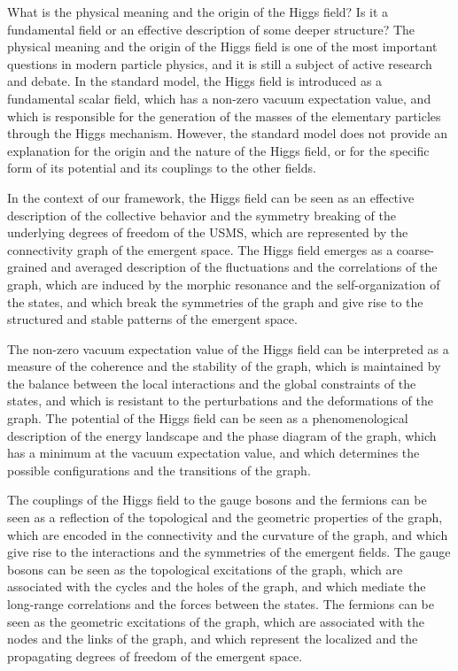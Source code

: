 \begin{tcolorbox}[colback=green!5!white,colframe=green!75!black,title=Question]
What is the physical meaning and the origin of the Higgs field? Is it a fundamental field or an effective description of some deeper structure?
\tcblower
The physical meaning and the origin of the Higgs field is one of the most important questions in modern particle physics, and it is still a subject of active research and debate. In the standard model, the Higgs field is introduced as a fundamental scalar field, which has a non-zero vacuum expectation value, and which is responsible for the generation of the masses of the elementary particles through the Higgs mechanism. However, the standard model does not provide an explanation for the origin and the nature of the Higgs field, or for the specific form of its potential and its couplings to the other fields.

In the context of our framework, the Higgs field can be seen as an effective description of the collective behavior and the symmetry breaking of the underlying degrees of freedom of the USMS, which are represented by the connectivity graph of the emergent space. The Higgs field emerges as a coarse-grained and averaged description of the fluctuations and the correlations of the graph, which are induced by the morphic resonance and the self-organization of the states, and which break the symmetries of the graph and give rise to the structured and stable patterns of the emergent space.

The non-zero vacuum expectation value of the Higgs field can be interpreted as a measure of the coherence and the stability of the graph, which is maintained by the balance between the local interactions and the global constraints of the states, and which is resistant to the perturbations and the deformations of the graph. The potential of the Higgs field can be seen as a phenomenological description of the energy landscape and the phase diagram of the graph, which has a minimum at the vacuum expectation value, and which determines the possible configurations and the transitions of the graph.

The couplings of the Higgs field to the gauge bosons and the fermions can be seen as a reflection of the topological and the geometric properties of the graph, which are encoded in the connectivity and the curvature of the graph, and which give rise to the interactions and the symmetries of the emergent fields. The gauge bosons can be seen as the topological excitations of the graph, which are associated with the cycles and the holes of the graph, and which mediate the long-range correlations and the forces between the states. The fermions can be seen as the geometric excitations of the graph, which are associated with the nodes and the links of the graph, and which represent the localized and the propagating degrees of freedom of the emergent space.


\end{tcolorbox}
